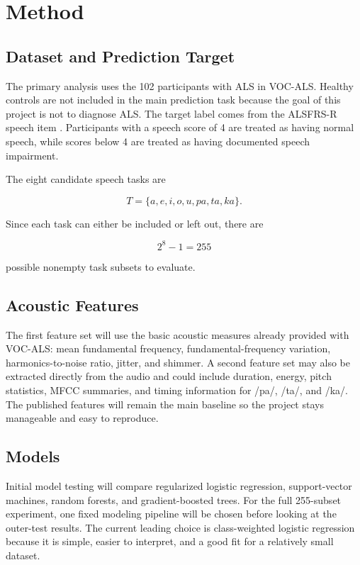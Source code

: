 \section{Method}

\subsection{Dataset and Prediction Target}

The primary analysis uses the 102 participants with ALS in VOC-ALS. Healthy controls are not included in the main prediction task because the goal of this project is not to diagnose ALS. The target label comes from the ALSFRS-R speech item \cite{cedarbaum1999alsfrsr}. Participants with a speech score of 4 are treated as having normal speech, while scores below 4 are treated as having documented speech impairment.

The eight candidate speech tasks are

$$
T=\{a,e,i,o,u,pa,ta,ka\}.
$$

Since each task can either be included or left out, there are

$$
2^8-1=255
$$

possible nonempty task subsets to evaluate.

\subsection{Acoustic Features}

The first feature set will use the basic acoustic measures already provided with VOC-ALS: mean fundamental frequency, fundamental-frequency variation, harmonics-to-noise ratio, jitter, and shimmer. A second feature set may also be extracted directly from the audio and could include duration, energy, pitch statistics, MFCC summaries, and timing information for /pa/, /ta/, and /ka/. The published features will remain the main baseline so the project stays manageable and easy to reproduce.

\subsection{Models}

Initial model testing will compare regularized logistic regression, support-vector machines, random forests, and gradient-boosted trees. For the full 255-subset experiment, one fixed modeling pipeline will be chosen before looking at the outer-test results. The current leading choice is class-weighted logistic regression because it is simple, easier to interpret, and a good fit for a relatively small dataset.

